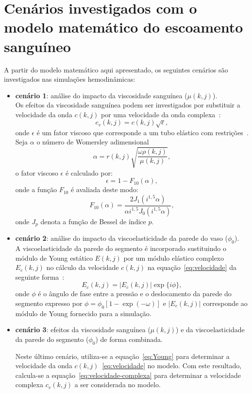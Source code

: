 \documentclass[
        english,			
        brazil			        %
        ,<...>]{abntbibufjf}
\begin{document}
\section{Cenários investigados com o modelo matemático do escoamento sanguíneo}
\label{sec:cenario}
A partir do modelo matemático aqui apresentado, os seguintes cenários são investigados nas simulações hemodinâmicas:
\begin{itemize}
	\item \textbf{cenário 1}: análise do impacto da viscosidade sanguínea ($\mu(k,j)$).\\
	Os efeitos da viscosidade sanguínea podem ser investigados por substituir a velocidade
	da onda $c(k,j)$ por uma velocidade da onda complexa~\cite{Duan1992}:
	\begin{equation} 
	c_v(k,j) = c(k,j) \sqrt{\epsilon},\label{eq:velocidade-complexa}
	\end{equation}
	onde $\epsilon$ é um fator viscoso que corresponde a um tubo elástico com restrições~\cite{Duan1992}. Seja $\alpha$ o
	número de Womersley adimensional
	\begin{equation}
	\alpha = r(k,j) \sqrt{\frac{\omega \rho(k,j)}{\mu(k,j)}},
	\end{equation}
	o fator viscoso $\epsilon$ é calculado por:
	\begin{equation}
	\epsilon = 1 - F_{10} (\alpha),
	\end{equation}
	onde a função $F_{10}$ é avaliada deste modo:
	\begin{equation}
	F_{10} (\alpha) = \frac{2 J_1(i^{1,5} \alpha)}{\alpha i^{1,5}J_0(i^{1,5} \alpha)},
	\end{equation}
	onde $J_p$ denota a função de Bessel de índice $p$.
	
	\item \textbf{cenário 2}: análise do impacto da viscoelasticidade da parede do vaso ($\phi_0$).\\
	A viscoelasticidade da parede do segmento é incorporado sustituindo o módulo de Young
	estático $E(k,j)$ por um módulo elástico complexo $E_c(k,j)$ no cálculo da velocidade $c(k,j)$ na equação~\eqref{eq:velocidade}
	da seguinte forma~\cite{Duan}:
	\begin{equation}
	E_c(k,j) = |E_c(k,j)| \exp\{i\phi\},\label{eq:Young}
	\end{equation}
	onde $\phi$ é o ângulo de fase entre a pressão e o deslocamento da parede do segmento \cite{Taylor3} expresso por $\phi = \phi_0 [1-\exp(-\omega)]$ e $|E_c (k,j)|$ corresponde ao módulo de Young fornecido para a simulação.
	
	\item \textbf{cenário 3}: efeitos da viscosidade sanguínea ($\mu(k,j)$) e da viscoelasticidade da parede do segmento ($\phi_0$) de forma combinada.
	
	Neste último cenário, utiliza-se a equação~\eqref{eq:Young} para determinar a velocidade da onda $c(k,j)$~\eqref{eq:velocidade} no modelo. Com este resultado, calcula-se  a equação~\eqref{eq:velocidade-complexa} para determinar a velocidade complexa $c_v(k,j)$ a ser considerada no modelo.
\end{itemize}
\end{document}
